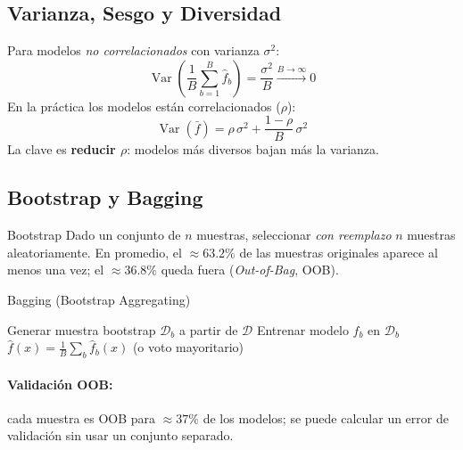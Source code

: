 \documentclass[12pt, a4paper]{article}
\DeclareMathOperator{\Var}{Var}
\begin{document}
\subsection{Varianza, Sesgo y Diversidad}

Para modelos \emph{no correlacionados} con varianza $\sigma^2$:
\[
	\Var\!\left(\frac{1}{B}\sum_{b=1}^{B}\hat{f}_b\right)
	= \frac{\sigma^2}{B} \xrightarrow{B\to\infty} 0
\]
En la práctica los modelos están correlacionados ($\rho$):
\[
	\Var(\bar{f}) = \rho\,\sigma^2 + \frac{1-\rho}{B}\,\sigma^2
\]
La clave es \textbf{reducir $\rho$}: modelos más diversos bajan más la varianza.

\subsection{Bootstrap y Bagging}

\begin{defbox}{Bootstrap}
	Dado un conjunto de $n$ muestras, seleccionar \emph{con reemplazo} $n$ muestras
	aleatoriamente. En promedio, el $\approx 63.2\%$ de las muestras originales aparece
	al menos una vez; el $\approx 36.8\%$ queda fuera (\emph{Out-of-Bag}, OOB).
\end{defbox}

\begin{algbox}{Bagging (Bootstrap Aggregating)}
	\begin{algorithmic}[1]
		\State Generar muestra bootstrap $\mathcal{D}_b$ a partir de $\mathcal{D}$
		\State Entrenar modelo $\hat{f}_b$ en $\mathcal{D}_b$
		\EndFor
		\State \Return $\hat{f}(x) = \frac{1}{B}\sum_b\hat{f}_b(x)$ (o voto mayoritario)
	\end{algorithmic}
\end{algbox}

\paragraph{Validación OOB:} cada muestra es OOB para $\approx 37\%$ de los modelos;
se puede calcular un error de validación sin usar un conjunto separado.
\end{document}
